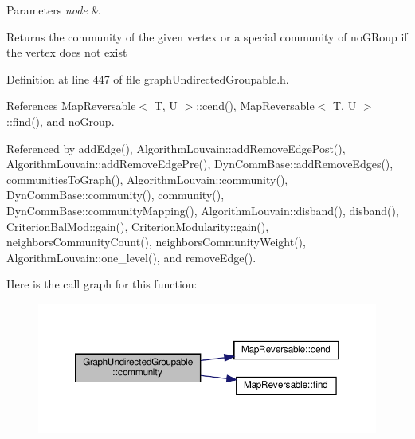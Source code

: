 \begin{DoxyParams}{Parameters}
{\em node} & \\
\hline
\end{DoxyParams}
\begin{DoxyReturn}{Returns}
the community of the given vertex or a special community of no\+G\+Roup if the vertex does not exist 
\end{DoxyReturn}


Definition at line 447 of file graph\+Undirected\+Groupable.\+h.



References Map\+Reversable$<$ T, U $>$\+::cend(), Map\+Reversable$<$ T, U $>$\+::find(), and no\+Group.



Referenced by add\+Edge(), Algorithm\+Louvain\+::add\+Remove\+Edge\+Post(), Algorithm\+Louvain\+::add\+Remove\+Edge\+Pre(), Dyn\+Comm\+Base\+::add\+Remove\+Edges(), communities\+To\+Graph(), Algorithm\+Louvain\+::community(), Dyn\+Comm\+Base\+::community(), community(), Dyn\+Comm\+Base\+::community\+Mapping(), Algorithm\+Louvain\+::disband(), disband(), Criterion\+Bal\+Mod\+::gain(), Criterion\+Modularity\+::gain(), neighbors\+Community\+Count(), neighbors\+Community\+Weight(), Algorithm\+Louvain\+::one\+\_\+level(), and remove\+Edge().

Here is the call graph for this function\+:\nopagebreak
\begin{figure}[H]
\begin{center}
\leavevmode
\includegraphics[width=350pt]{classGraphUndirectedGroupable_ad40474d566b3f9fbe9d132fbbe562ed5_cgraph}
\end{center}
\end{figure}
\mbox{\label{classGraphUndirectedGroupable_a7a9642a50ac522d9020afb9df211702f}} 
